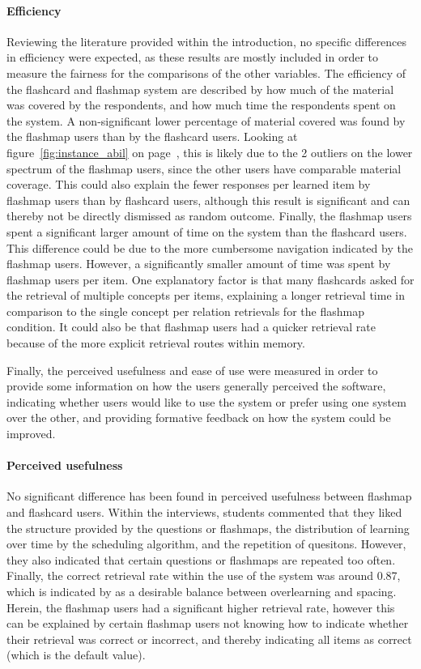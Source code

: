 \paragraph{Efficiency} Reviewing the literature provided within the introduction, no specific differences in efficiency were expected, as these results are mostly included in order to measure the fairness for the comparisons of the other variables. The efficiency of the flashcard and flashmap system are described by how much of the material was covered by the respondents, and how much time the respondents spent on the system. A non-significant lower percentage of material covered was found by the flashmap users than by the flashcard users. Looking at figure~\ref{fig:instance_abil} on page~\pageref{fig:instance_abil}, this is likely due to the 2 outliers on the lower spectrum of the flashmap users, since the other users have comparable material coverage. This could also explain the fewer responses per learned item by flashmap users than by flashcard users, although this result is significant and can thereby not be directly dismissed as random outcome. Finally, the flashmap users spent a significant larger amount of time on the system than the flashcard users. This difference could be due to the more cumbersome navigation indicated by the flashmap users. However, a significantly smaller amount of time was spent by flashmap users per item. One explanatory factor is that many flashcards asked for the retrieval of multiple concepts per items, explaining a longer retrieval time in comparison to the single concept per relation retrievals for the flashmap condition. It could also be that flashmap users had a quicker retrieval rate because of the more explicit retrieval routes within memory.

Finally, the perceived usefulness and ease of use were measured in order to provide some information on how the users generally perceived the software, indicating whether users would like to use the system or prefer using one system over the other, and providing formative feedback on how the system could be improved.

\paragraph{Perceived usefulness} No significant difference has been found in perceived usefulness between flashmap and flashcard users. Within the interviews, students commented that they liked the structure provided by the questions or flashmaps, the distribution of learning over time by the scheduling algorithm, and the repetition of quesitons. However, they also indicated that certain questions or flashmaps are repeated too often. Finally, the correct retrieval rate within the use of the system was around 0.87, which is indicated by  as a desirable balance between overlearning and spacing. Herein, the flashmap users had a significant higher retrieval rate, however this can be explained by certain flashmap users not knowing how to indicate whether their retrieval was correct or incorrect, and thereby indicating all items as correct (which is the default value).

